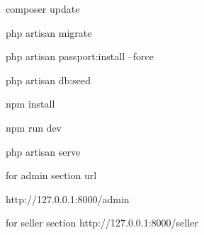 
composer update


php artisan migrate


php artisan passport:install --force


php artisan db:seed

npm install


npm run dev


php artisan serve

for admin section  url

http://127.0.0.1:8000/admin


for seller section
http://127.0.0.1:8000/seller
